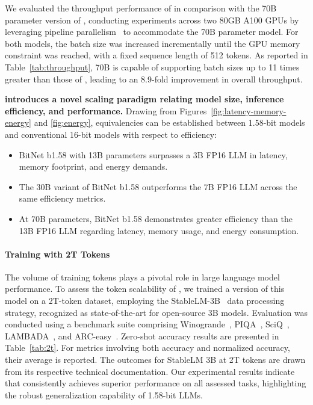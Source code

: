 We evaluated the throughput performance of  in comparison with the 70B parameter version of , conducting experiments across two 80GB A100 GPUs by leveraging pipeline parallelism~\cite{gpipe} to accommodate the 70B parameter  model. For both models, the batch size was increased incrementally until the GPU memory constraint was reached, with a fixed sequence length of 512 tokens. As reported in Table~\ref{tab:throughput},  70B is capable of supporting batch sizes up to 11 times greater than those of , leading to an 8.9-fold improvement in overall throughput.

\textbf{ introduces a novel scaling paradigm relating model size, inference efficiency, and performance.} Drawing from Figures~\ref{fig:latency-memory-energy} and \ref{fig:energy}, equivalencies can be established between 1.58-bit models and conventional 16-bit models with respect to efficiency:

\begin{itemize}
    \item BitNet b1.58 with 13B parameters surpasses a 3B FP16 LLM in latency, memory footprint, and energy demands.
    \item The 30B variant of BitNet b1.58 outperforms the 7B FP16 LLM across the same efficiency metrics.
    \item At 70B parameters, BitNet b1.58 demonstrates greater efficiency than the 13B FP16 LLM regarding latency, memory usage, and energy consumption.
\end{itemize}

\paragraph{Training with 2T Tokens}

The volume of training tokens plays a pivotal role in large language model performance. To assess the token scalability of , we trained a version of this model on a 2T-token dataset, employing the StableLM-3B~\cite{StableLM-3B-4E1T} data processing strategy, recognized as state-of-the-art for open-source 3B models. Evaluation was conducted using a benchmark suite comprising Winogrande~\cite{winoGrande}, PIQA~\cite{piqa}, SciQ~\cite{sciq}, LAMBADA~\cite{lambada}, and ARC-easy~\cite{arc}. Zero-shot accuracy results are presented in Table~\ref{tab:2t}. For metrics involving both accuracy and normalized accuracy, their average is reported. The outcomes for StableLM 3B at 2T tokens are drawn from its respective technical documentation. Our experimental results indicate that  consistently achieves superior performance on all assessed tasks, highlighting the robust generalization capability of 1.58-bit LLMs.

